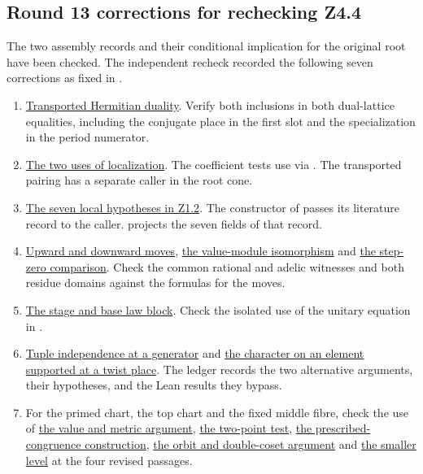 \subsection{Round 13 corrections for rechecking Z4.4}\label{r13:recheck}
The two assembly records and their conditional implication for the
original root have been checked. The independent recheck recorded the following
seven corrections as fixed in .
\begin{enumerate}
\item \hyperref[r13:weyl-dual]{Transported Hermitian duality}.
Verify both inclusions in both dual-lattice equalities, including the
conjugate place in the first slot and the specialization in the period numerator.
\item \hyperref[r13:nabdelloc]{The two uses of localization}.
The coefficient tests use  via
. The transported pairing has a separate
caller in the root cone.
\item \hyperref[r12:z12-stage]{The seven local hypotheses in Z1.2}.
The constructor of  passes its literature record to
the caller.  projects the seven fields of that
record.
\item \hyperref[r13:move-fields]{Upward and downward moves},
\hyperref[r13:fv-field]{the value-module isomorphism} and
\hyperref[r13:lv-zero]{the step-zero comparison}. Check the common
rational and adelic witnesses and both residue domains against the
formulas for the moves.
\item \hyperref[r13:stage-unit]{The stage and base law block}.
Check the isolated use of the unitary equation in .
\item \hyperref[r13:tuple-independence]{Tuple independence at a generator}
and \hyperref[r13:near-character]{the character on an element supported at a
twist place}. The ledger records the two alternative arguments, their
hypotheses, and the Lean results they bypass.
\item For the primed chart, the top chart and the fixed middle fibre, check
the use of \hyperref[r13:s9-values]{the value and metric argument},
\hyperref[r13:s9-twopoints]{the two-point test},
\hyperref[r13:s9-congruence]{the prescribed-congruence construction},
\hyperref[r13:s9-cosets]{the orbit and double-coset argument} and
\hyperref[r13:s9-shrink]{the smaller level} at the four revised passages.
\end{enumerate}

